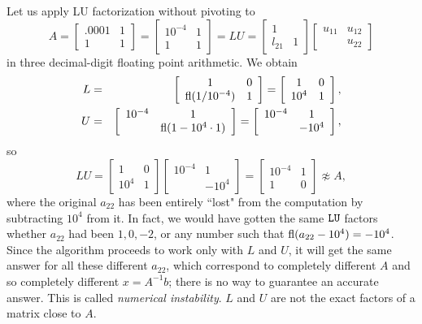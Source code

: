 \documentclass[11pt]{article}
\def\fl{\mbox{\rm fl}}
\begin{document}
\begin{enumerate}
Let us apply LU factorization without pivoting to 
$$A = \left[\begin{array}{cc} .0001 & 1\\ 1 & 1\end{array}\right]
= \left[\begin{array}{cc} 10^{-4} & 1\\  1 & 1\end{array}\right]
= L U = \left[\begin{array}{cc} 1 &   \\  l_{21} & 1\end{array}\right]
  \left[\begin{array}{cc} u_{11} & u_{12} \\  & u_{22} \end{array}\right]
$$
in three decimal-digit floating point arithmetic. We obtain 
\begin{eqnarray*}
{L} &=&\left[\begin{array}{cc} 1 & 0 \\ \fl(1/10^{-4})& 1\end{array}\right]
         = \left[\begin{array}{cc} 1 & 0 \\ 10^{4}& 1\end{array}\right], \\
{U} &=&\left[\begin{array}{cc} 10^{-4} & 1\\  &\fl(1-10^4\cdot 1)
           \end{array}\right]
         = \left[\begin{array}{cc} 10^{-4} & 1\\  & -10^4 
           \end{array}\right],
\end{eqnarray*}
so 
$${LU} =\left[\begin{array}{cc} 1 & 0 \\ 10^4 & 1\end{array}\right]	
           \left[\begin{array}{cc} 10^{-4} & 1\\  &-10^4\end{array}\right]
          =\left[\begin{array}{cc} 10^{-4} & 1\\  1 & 0\end{array}\right]
          \not\approx A,
$$
where the original $a_{22}$ has been entirely ``lost" from the computation 
by subtracting $10^4$ from it. In fact, we would have gotten the same ${\tt LU}$ 
factors whether $a_{22}$ had been $1, 0, -2$, or any number such that 
$\fl(a_{22}- 10^4)=-10^4$. Since the algorithm proceeds to work only 
with ${L}$ and ${U}$, it will get the same answer for all these 
different $a_{22}$, which correspond to completely different $A$ and 
so completely different $x = A^{-1}b$; there is no way to guarantee an 
accurate answer. This is called {\em numerical instability}. $L$  and 
$U$ are not the exact
factors of a matrix close to $A$. 


\end{enumerate}
\end{document}
